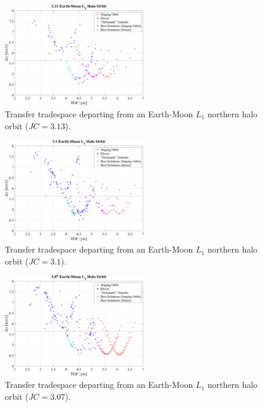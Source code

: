 \begin{figure}[ht]
    \centering
    \includegraphics[width=0.55\textwidth]{figures/TradeSpace_L1Halo_3_13.pdf}
    \caption{Transfer tradespace departing from an Earth-Moon $L_{1}$ northern halo orbit ($JC=3.13$).}
\end{figure}

\begin{figure}[ht]
    \centering
    \includegraphics[width=0.55\textwidth]{figures/TradeSpace_L1Halo_3_10.pdf}
    \caption{Transfer tradespace departing from an Earth-Moon $L_{1}$ northern halo orbit ($JC=3.1$).}
\end{figure}
\clearpage

\begin{figure}[ht]
    \centering
    \includegraphics[width=0.55\textwidth]{figures/TradeSpace_L1Halo_3_07.pdf}
    \caption{Transfer tradespace departing from an Earth-Moon $L_{1}$ northern halo orbit ($JC=3.07$).}
\end{figure}

